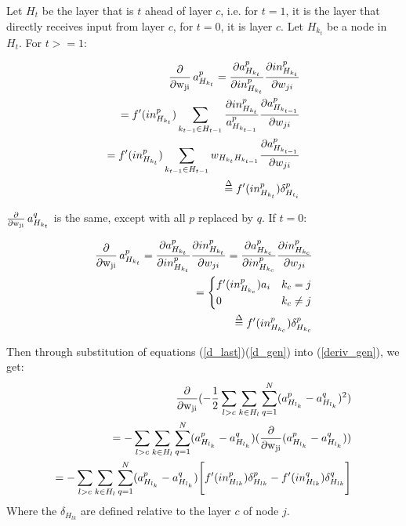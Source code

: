 Let $H_t$ be the layer that is $t$ ahead of layer $c$, i.e. for $t=1$, it is the layer that directly receives input from layer $c$, for $t=0$, it is layer $c$. Let $H_{k_t}$ be a node in $H_t$. For $t>=1$:

\begin{align}
    \Deriv a_{H_{k_t}}^p = \frac{\partial a_{H_{k_t}}^p}{\partial in_{H_{k_t}}^p}\frac{\partial in_{H_{k_t}}^p}{\partial w_{ji}} \\
    = f'(in_{H_{k_t}}^p)\sum_{k_{t-1}\in H_{t-1}} \frac{\partial in_{H_{k_t}}^p}{a_{H_{k_{t-1}}}^p} \frac{\partial a_{H_{k_{t-1}}}^p}{\partial w_{ji}} \\
    = f'(in_{H_{k_t}}^p) \sum_{k_{t-1}\in H_{t-1}} w_{H_{k_t}H_{k_{t-1}}} \frac{\partial a_{H_{k_{t-1}}}^p}{\partial w_{ji}} \\
    \overset{\Delta}{=} f'(in_{H_{k_t}}^p)\delta_{H_{t_i}}^p \label{d_gen}
\end{align}

$\operatorname{\frac{\partial}{\partial w_{ji}}} a_{H_{k_t}}^q$ is the same, except with all $p$ replaced by $q$. If $t=0$:

\begin{align}
    \Deriv a_{H_{k_t}}^p = \frac{\partial a_{H_{k_t}}^p}{\partial in_{H_{k_t}}^p}\frac{\partial in_{H_{k_t}}^p}{\partial w_{ji}} = \frac{\partial a_{H_{k_c}}^p}{\partial in_{H_{k_c}}^p}\frac{\partial in_{H_{k_c}}^p}{\partial w_{ji}} \\
    = 
    \begin{cases}
        f'(in_{H_{k_c}}^p)a_i & k_c = j \\
        0 & k_c \neq j
    \end{cases} \\
    \overset{\Delta}{=} f'(in_{H_{k_c}}^p)\delta_{H_{k_c}}^p \label{d_last}
\end{align}

Then through substitution of equations (\ref{d_last})(\ref{d_gen}) into (\ref{deriv_gen}), we get:
\begin{align}
    \operatorname{\frac{\partial}{\partial w_{ji}}} (-\frac{1}{2}\sum_{l>c}\sum_{k\in H_{l}}\sum_{q=1}^N (a_{H_{l_k}}^p - a_{H_{l_k}}^q)^2) \\
    = -\sum_{l>c}\sum_{k\in H_{l}}\sum_{q=1}^N (a_{H_{l_k}}^p - a_{H_{l_k}}^q) (\operatorname{\frac{\partial}{\partial w_{ji}}}(a_{H_{l_k}}^p - a_{H_{l_k}}^q)) \\
    = -\sum_{l>c}\sum_{k\in H_{l}}\sum_{q=1}^N (a_{H_{l_k}}^p - a_{H_{l_k}}^q)  \Bigg[f'(in_{H_{lk}}^p)\delta_{H_{lk}}^p - f'(in_{H_{lk}}^q)\delta_{H_{lk}}^q  \Bigg]
\end{align}
Where the $\delta_{H_{lk}}$ are defined relative to the layer $c$ of node $j$. 
